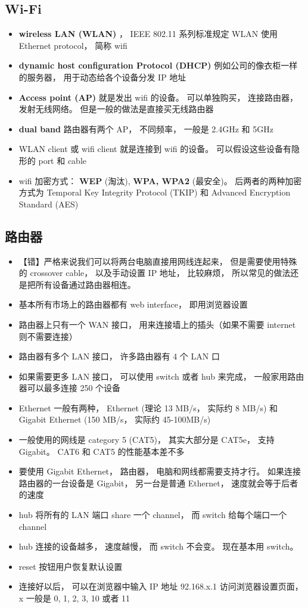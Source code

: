 \subsection{Wi-Fi}
\begin{itemize}
\item \textbf{wireless LAN (WLAN)} ， IEEE 802.11 系列标准规定 WLAN 使用 Ethernet protocol， 简称 wifi
\item \textbf{dynamic host configuration Protocol (DHCP)} 例如公司的像衣柜一样的服务器， 用于动态给各个设备分发 IP 地址
\item \textbf{Access point (AP)} 就是发出 wifi 的设备。 可以单独购买， 连接路由器， 发射无线网络。 但是一般的做法是直接买无线路由器
\item \textbf{dual band} 路由器有两个 AP， 不同频率， 一般是 2.4GHz 和 5GHz
\item WLAN client 或 wifi client 就是连接到 wifi 的设备。 可以假设这些设备有隐形的 port 和 cable
\item wifi 加密方式： \textbf{WEP} (淘汰), \textbf{WPA, WPA2} (最安全)。 后两者的两种加密方式为 Temporal Key Integrity Protocol (TKIP) 和 Advanced Encryption Standard (AES)
\end{itemize}

\subsection{路由器}
\begin{itemize}
\item 【错】严格来说我们可以将两台电脑直接用网线连起来， 但是需要使用特殊的 crossover cable， 以及手动设置 IP 地址， 比较麻烦， 所以常见的做法还是把所有设备通过路由器相连。
\item 基本所有市场上的路由器都有 web interface， 即用浏览器设置
\item 路由器上只有一个 WAN 接口， 用来连接墙上的插头（如果不需要 internet 则不需要连接）
\item 路由器有多个 LAN 接口， 许多路由器有 4 个 LAN 口
\item 如果需要更多 LAN 接口， 可以使用 switch 或者 hub 来完成， 一般家用路由器可以最多连接 250 个设备
\item Ethernet 一般有两种， Ethernet (理论 13 MB/s， 实际约 8 MB/s) 和 Gigabit Ethernet (150 MB/s， 实际约 45-100MB/s)
\item 一般使用的网线是 category 5 (CAT5)， 其实大部分是 CAT5e， 支持 Gigabit。 CAT6 和 CAT5 的性能基本差不多
\item 要使用 Gigabit Ethernet， 路由器， 电脑和网线都需要支持才行。 如果连接路由器的一台设备是 Gigabit， 另一台是普通 Ethernet， 速度就会等于后者的速度
\item hub 将所有的 LAN 端口 share 一个 channel， 而 switch 给每个端口一个 channel
\item hub 连接的设备越多， 速度越慢， 而 switch 不会变。 现在基本用 switch。
\item reset 按钮用户恢复默认设置
\item 连接好以后， 可以在浏览器中输入 IP 地址 92.168.x.1 访问浏览器设置页面， x 一般是 0, 1, 2, 3, 10 或者 11
\end{itemize}

